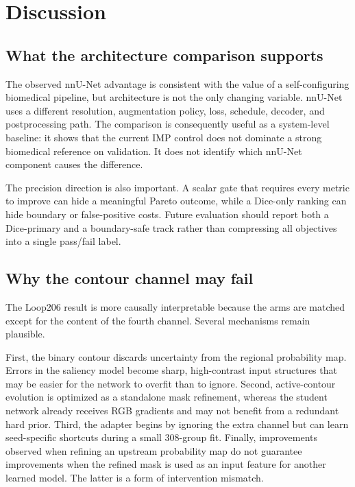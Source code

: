 \section{Discussion}

\subsection{What the architecture comparison supports}

The observed nnU-Net advantage is consistent with the value of a self-configuring biomedical pipeline, but architecture is not the only changing variable. nnU-Net uses a different resolution, augmentation policy, loss, schedule, decoder, and postprocessing path. The comparison is consequently useful as a system-level baseline: it shows that the current IMP control does not dominate a strong biomedical reference on validation. It does not identify which nnU-Net component causes the difference.

The precision direction is also important. A scalar gate that requires every metric to improve can hide a meaningful Pareto outcome, while a Dice-only ranking can hide boundary or false-positive costs. Future evaluation should report both a Dice-primary and a boundary-safe track rather than compressing all objectives into a single pass/fail label.

\subsection{Why the contour channel may fail}

The Loop206 result is more causally interpretable because the arms are matched except for the content of the fourth channel. Several mechanisms remain plausible.

First, the binary contour discards uncertainty from the regional probability map. Errors in the saliency model become sharp, high-contrast input structures that may be easier for the network to overfit than to ignore. Second, active-contour evolution is optimized as a standalone mask refinement, whereas the student network already receives RGB gradients and may not benefit from a redundant hard prior. Third, the adapter begins by ignoring the extra channel but can learn seed-specific shortcuts during a small 308-group fit. Finally, improvements observed when refining an upstream probability map do not guarantee improvements when the refined mask is used as an input feature for another learned model. The latter is a form of intervention mismatch.


